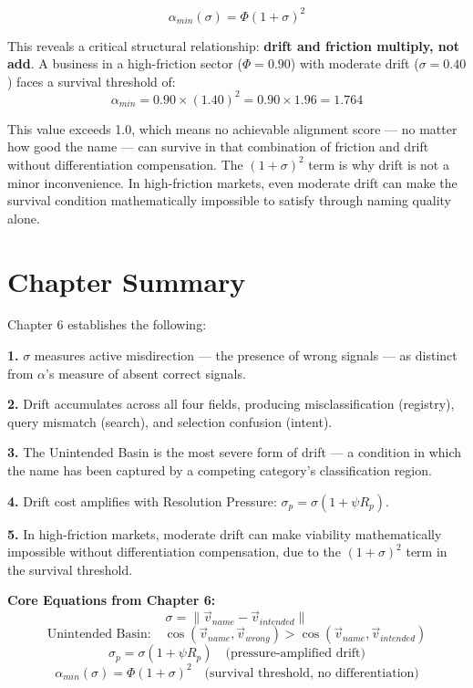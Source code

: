 \documentclass[12pt, openany]{book}
\theoremstyle{thmstyle}
\theoremstyle{defstyle}
\begin{document}
\[
\alpha_{min}(\sigma) = \Phi(1+\sigma)^2
\]

This reveals a critical structural relationship: \textbf{drift and friction multiply, not add}. A business in a high-friction sector ($\Phi = 0.90$) with moderate drift ($\sigma = 0.40$) faces a survival threshold of:
\[
\alpha_{min} = 0.90 \times (1.40)^2 = 0.90 \times 1.96 = 1.764
\]

This value exceeds 1.0, which means no achievable alignment score --- no matter how good the name --- can survive in that combination of friction and drift without differentiation compensation. The $(1+\sigma)^2$ term is why drift is not a minor inconvenience. In high-friction markets, even moderate drift can make the survival condition mathematically impossible to satisfy through naming quality alone.

\section{Chapter Summary}

Chapter 6 establishes the following:

\textbf{1.} $\sigma$ measures active misdirection --- the presence of wrong signals --- as distinct from $\alpha$'s measure of absent correct signals.

\textbf{2.} Drift accumulates across all four fields, producing misclassification (registry), query mismatch (search), and selection confusion (intent).

\textbf{3.} The Unintended Basin is the most severe form of drift --- a condition in which the name has been captured by a competing category's classification region.

\textbf{4.} Drift cost amplifies with Resolution Pressure: $\sigma_p = \sigma(1 + \psi R_p)$.

\textbf{5.} In high-friction markets, moderate drift can make viability mathematically impossible without differentiation compensation, due to the $(1+\sigma)^2$ term in the survival threshold.

\begin{equationbox}
\textbf{Core Equations from Chapter 6:}
\[
\sigma = \|\vec{v}_{name} - \vec{v}_{intended}\|
\]
\[
\text{Unintended Basin:} \quad \cos(\vec{v}_{name}, \vec{v}_{wrong}) > \cos(\vec{v}_{name}, \vec{v}_{intended})
\]
\[
\sigma_p = \sigma(1 + \psi R_p) \quad \text{(pressure-amplified drift)}
\]
\[
\alpha_{min}(\sigma) = \Phi(1+\sigma)^2 \quad \text{(survival threshold, no differentiation)}
\]
\end{equationbox}
\end{document}
